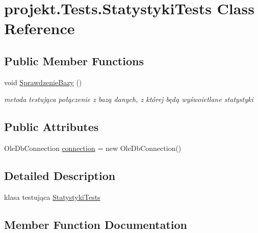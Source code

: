 \hypertarget{classprojekt_1_1_tests_1_1_statystyki_tests}{}\section{projekt.\+Tests.\+Statystyki\+Tests Class Reference}
\label{classprojekt_1_1_tests_1_1_statystyki_tests}


 


\subsection*{Public Member Functions}
\begin{DoxyCompactItemize}
\item 
void \mbox{\hyperlink{classprojekt_1_1_tests_1_1_statystyki_tests_a2f1745f7152abbff76600073f94dee62}{Sprawdzenie\+Bazy}} ()
\begin{DoxyCompactList}\small\item\em metoda testująca połączenie z bazą danych, z której będą wyśwoietlane statystyki \end{DoxyCompactList}\end{DoxyCompactItemize}
\subsection*{Public Attributes}
\begin{DoxyCompactItemize}
\item 
Ole\+Db\+Connection \mbox{\hyperlink{classprojekt_1_1_tests_1_1_statystyki_tests_afd97556a71a8fae8cca5c7cdf39dbebe}{connection}} = new Ole\+Db\+Connection()
\end{DoxyCompactItemize}


\subsection{Detailed Description}


klasa testująca \mbox{\hyperlink{classprojekt_1_1_tests_1_1_statystyki_tests}{Statystyki\+Tests}} 

\subsection{Member Function Documentation}
\mbox{\label{classprojekt_1_1_tests_1_1_statystyki_tests_a2f1745f7152abbff76600073f94dee62}} 
